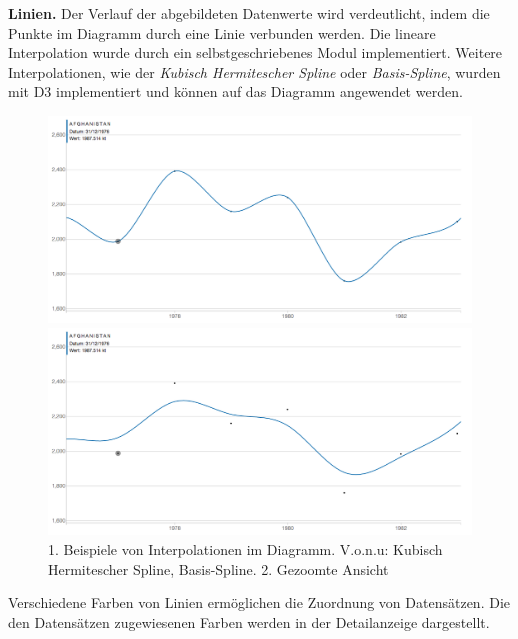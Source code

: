 \textbf{Linien.} Der Verlauf der abgebildeten Datenwerte wird verdeutlicht, indem die Punkte im Diagramm durch eine Linie verbunden werden. Die lineare Interpolation wurde durch ein selbstgeschriebenes Modul implementiert. Weitere Interpolationen, wie der \textit{Kubisch Hermitescher Spline} oder \textit{Basis-Spline}, wurden mit D3 implementiert und können auf das Diagramm angewendet werden.

\begin{figure}[!htbp]
	\begin{minipage}{\textwidth}
		\centering
		\includegraphics[width=\linewidth]{images/cardinal}
	\end{minipage}
	\begin{minipage}{\textwidth}
		\centering
		\includegraphics[width=\linewidth]{images/basis}
	\end{minipage}
	\caption[Beispiele von Interpolationen und Zoom]{1. Beispiele von Interpolationen im Diagramm. V.o.n.u: Kubisch Hermitescher Spline, Basis-Spline. 2. Gezoomte Ansicht}
	\label{fig:vergleich}
\end{figure}

Verschiedene Farben von Linien ermöglichen die Zuordnung von Datensätzen. Die den Datensätzen zugewiesenen Farben werden in der Detailanzeige dargestellt.

